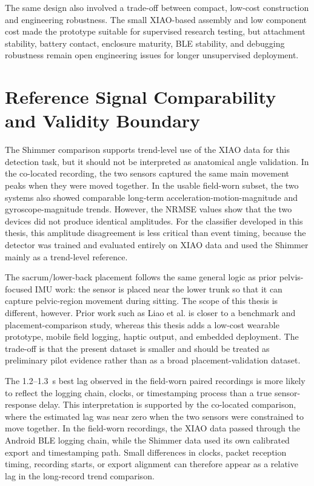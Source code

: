 The same design also involved a trade-off between compact, low-cost construction and engineering robustness. The small XIAO-based assembly and low component cost made the prototype suitable for supervised research testing, but attachment stability, battery contact, enclosure maturity, BLE stability, and debugging robustness remain open engineering issues for longer unsupervised deployment.

\section{Reference Signal Comparability and Validity Boundary}

The Shimmer comparison supports trend-level use of the XIAO data for this detection task, but it should not be interpreted as anatomical angle validation. In the co-located recording, the two sensors captured the same main movement peaks when they were moved together. In the usable field-worn subset, the two systems also showed comparable long-term acceleration-motion-magnitude and gyroscope-magnitude trends. However, the NRMSE values show that the two devices did not produce identical amplitudes. For the classifier developed in this thesis, this amplitude disagreement is less critical than event timing, because the detector was trained and evaluated entirely on XIAO data and used the Shimmer mainly as a trend-level reference.

The sacrum/lower-back placement follows the same general logic as prior pelvis-focused IMU work: the sensor is placed near the lower trunk so that it can capture pelvic-region movement during sitting. The scope of this thesis is different, however. Prior work such as Liao et al. is closer to a benchmark and placement-comparison study, whereas this thesis adds a low-cost wearable prototype, mobile field logging, haptic output, and embedded deployment. The trade-off is that the present dataset is smaller and should be treated as preliminary pilot evidence rather than as a broad placement-validation dataset.

The 1.2--1.3~s best lag observed in the field-worn paired recordings is more likely to reflect the logging chain, clocks, or timestamping process than a true sensor-response delay. This interpretation is supported by the co-located comparison, where the estimated lag was near zero when the two sensors were constrained to move together. In the field-worn recordings, the XIAO data passed through the Android BLE logging chain, while the Shimmer data used its own calibrated export and timestamping path. Small differences in clocks, packet reception timing, recording starts, or export alignment can therefore appear as a relative lag in the long-record trend comparison.

